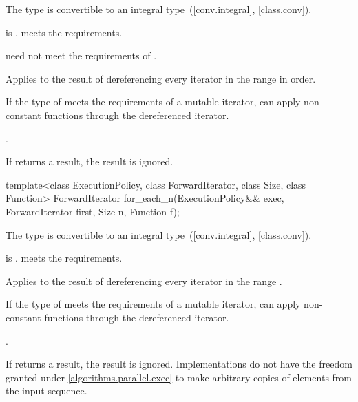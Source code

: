 \begin{itemdescr}
\pnum
\mandates
The type  is convertible
to an integral type~(\ref{conv.integral}, \ref{class.conv}).

\pnum
\expects
{} is .
 meets the  requirements.
\begin{note}
 need not meet
the requirements of .
\end{note}

\pnum
\effects
Applies  to the result of dereferencing
every iterator in the range  in order.
\begin{note}
If the type of  meets the requirements of a mutable iterator,
 can apply non-constant functions through the dereferenced iterator.
\end{note}

\pnum
\returns
{}.

\pnum
\remarks
If  returns a result, the result is ignored.
\end{itemdescr}

%
\begin{itemdecl}
template<class ExecutionPolicy, class ForwardIterator, class Size, class Function>
  ForwardIterator for_each_n(ExecutionPolicy&& exec, ForwardIterator first, Size n,
                             Function f);
\end{itemdecl}

\begin{itemdescr}
\pnum
\mandates
The type  is convertible
to an integral type~(\ref{conv.integral}, \ref{class.conv}).

\pnum
\expects
{} is .
 meets the  requirements.

\pnum
\effects
Applies  to the result of dereferencing
every iterator in the range .
\begin{note}
If the type of  meets the requirements of a mutable iterator,
 can apply non-constant functions through the dereferenced iterator.
\end{note}

\pnum
\returns
{}.

\pnum
\remarks
If  returns a result, the result is ignored.
Implementations do not have
the freedom granted under \ref{algorithms.parallel.exec}
to make arbitrary copies of elements from the input sequence.
\end{itemdescr}

